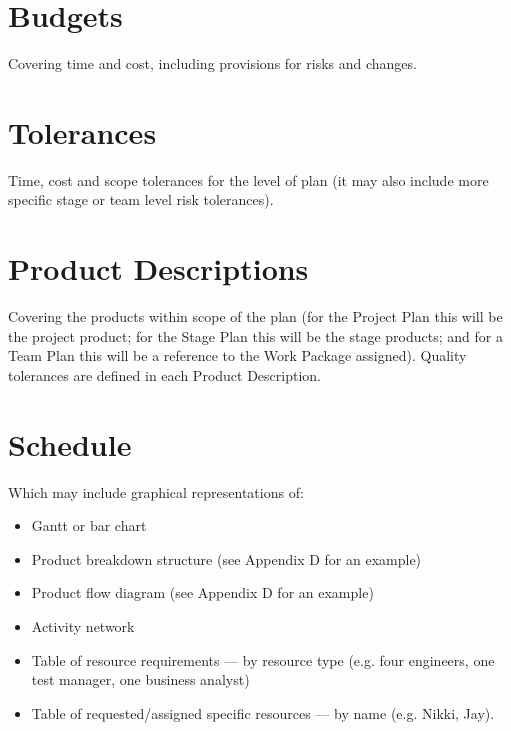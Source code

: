 \documentclass{report}
\begin{document}
\section{Budgets}
Covering time and cost, including provisions for risks and changes.

\section{Tolerances}
Time, cost and scope tolerances for the level of plan (it may also include more specific stage or team level risk tolerances).

\section{Product Descriptions}
Covering the products within scope of the plan (for the Project Plan this will be the project product; for the Stage Plan this will be the stage products; and for a Team Plan this will be a reference to the Work Package assigned).  Quality tolerances are defined in each Product Description.

\section{Schedule}

Which may include graphical representations of:
\begin{itemize}
\item Gantt or bar chart 
\item Product breakdown structure (see Appendix D for an example)
\item Product flow diagram (see Appendix D for an example)
\item Activity network 
\item Table of resource requirements --- by resource type (e.g. four engineers, one test manager, one business analyst)
\item Table of requested/assigned specific resources --- by name (e.g. Nikki, Jay).
\end{itemize}
\end{document}
